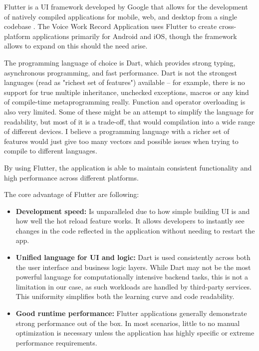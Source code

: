 \documentclass[
  digital,     %
  oneside,     %
  nosansbold,  %
  nocolorbold, %
  lof,         %
  lot,         %
]{fithesis4}
\begin{document}
Flutter is a \gls{UI} framework developed by Google that allows for the development of natively compiled applications for mobile, web, and desktop from a single codebase \cite{flutterGithub}. The Voice Work Record Application uses Flutter to create cross-platform applications primarily for Android and \gls{iOS}, though the framework allows to expand on this should the need arise.

The programming language of choice is Dart, which provides strong typing, asynchronous programming, and fast performance. Dart is not the strongest languages (read as "richest set of features") available – for example, there is no support for true multiple inheritance, unchecked exceptions, macros or any kind of compile-time metaprogramming really. Function and operator overloading is also very limited. Some of these might be an attempt to simplify the language for readability, but most of it is a trade-off, that would compilation into a wide range of different devices. I believe a programming language with a richer set of features would just give too many vectors and possible issues when trying to compile to different languages.

By using Flutter, the application is able to maintain consistent functionality and high performance across different platforms.

The core advantage of Flutter are following:
\begin{itemize}
    \item \textbf{Development speed:} Is unparalleled due to how simple building \gls{UI} is and how well the hot reload feature works. It allows developers to instantly see changes in the code reflected in the application without needing to restart the app.
    \item \textbf{Unified language for \gls{UI} and logic:} Dart is used consistently across both the user interface and business logic layers. While Dart may not be the most powerful language for computationally intensive backend tasks, this is not a limitation in our case, as such workloads are handled by third-party services. This uniformity simplifies both the learning curve and code readability.
    \item \textbf{Good runtime performance:} Flutter applications generally demonstrate strong performance out of the box. In most scenarios, little to no manual optimization is necessary unless the application has highly specific or extreme performance requirements.
\end{itemize}
\end{document}
